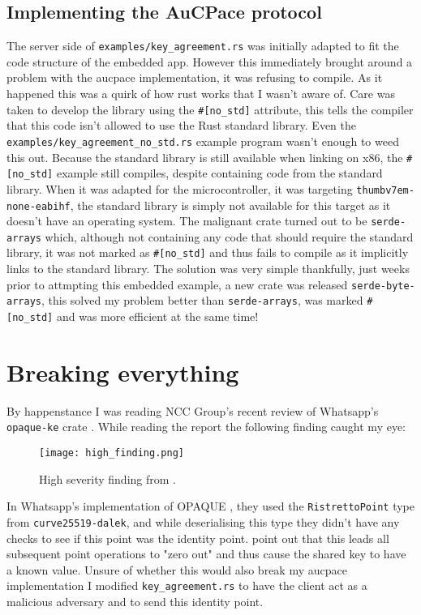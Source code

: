 \subsection{Implementing the AuCPace protocol}
The server side of \texttt{examples/key\_agreement.rs} was initially adapted to fit the code structure of the embedded app.
However this immediately brought around a problem with the \gls{aucpace} implementation, it was refusing to compile.
As it happened this was a quirk of how rust works that I wasn't aware of.
Care was taken to develop the library using the \verb|#[no_std]| attribute, this tells the compiler that this code isn't allowed to use the Rust standard library.
Even the \texttt{examples/key\_agreement\_no\_std.rs} example program wasn't enough to weed this out.
Because the standard library is still available when linking on x86, the \verb|#[no_std]| example still compiles, despite containing code from the standard library.
When it was adapted for the microcontroller, it was targeting \texttt{thumbv7em-none-eabihf}, the standard library is simply not available for this target as it doesn't have an operating system.
The malignant crate turned out to be \texttt{serde-arrays} which, although not containing any code that should require the standard library, it was not marked as \verb|#[no_std]| and thus fails to compile as it implicitly links to the standard library.
The solution was very simple thankfully, just weeks prior to attmpting this embedded example, a new crate was released \texttt{serde-byte-arrays}, this solved my problem better than \texttt{serde-arrays}, was marked \verb|#[no_std]| and was more efficient at the same time!

\section{Breaking everything}
By happenstance I was reading NCC Group's recent review of Whatsapp's \texttt{opaque-ke} crate \cite{whatsapp-are-dumb-too, whatsapp-are-dumb-too-report}.
While reading the report the following finding caught my eye:
\begin{figure}[H]
  \centering

  \texttt{[image: high\_finding.png]}
  \caption{High severity finding from \cite{whatsapp-are-dumb-too-report}.}
  \label{fig:high-severity-finding}
\end{figure}

In Whatsapp's implementation of OPAQUE \cite{opaque}, they used the \texttt{RistrettoPoint} type from \texttt{curve25519-dalek}, and while deserialising this type they didn't have any checks to see if this point was the identity point.
 point out that this leads all subsequent point operations to "zero out" and thus cause the shared key to have a known value.
Unsure of whether this would also break my \gls{aucpace} implementation I modified \texttt{key\_agreement.rs} to have the client act as a malicious adversary and to send this identity point.

